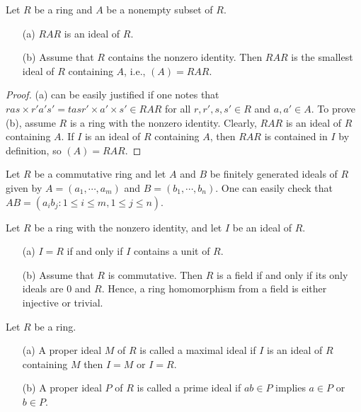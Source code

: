 \begin{prop}
    Let $R$ be a ring and $A$ be a nonempty subset of $R$.
    \begin{enumerate}
        \item[(a)]
        {
            $RAR$ is an ideal of $R$.
        }
        \item[(b)]
        {
            Assume that $R$ contains the nonzero identity.
            Then $RAR$ is the smallest ideal of $R$ containing $A$, i.e., $(A)=RAR$.
        }
    \end{enumerate}
\end{prop}
\begin{proof}
    (a) can be easily justified if one notes that $ras\times r'a's'=tasr'\times a'\times s'\in RAR$ for all $r, r', s, s'\in R$ and $a, a'\in A$.
    To prove (b), assume $R$ is a ring with the nonzero identity.
    Clearly, $RAR$ is an ideal of $R$ containing $A$.
    If $I$ is an ideal of $R$ containing $A$, then $RAR$ is contained in $I$ by definition, so $(A)=RAR$.
\end{proof}
\begin{obs}
    Let $R$ be a commutative ring and let $A$ and $B$ be finitely generated ideals of $R$ given by $A=(a_1, \cdots, a_m)$ and $B=(b_1, \cdots, b_n)$.
    One can easily check that $AB=(a_ib_j: 1\leq i\leq m, 1\leq j\leq n)$.
\end{obs}

\begin{prop}\label{field: trivial ideals only}
    Let $R$ be a ring with the nonzero identity, and let $I$ be an ideal of $R$.
    \begin{enumerate}
        \item[(a)]
        {
            $I=R$ if and only if $I$ contains a unit of $R$.
        }
        \item[(b)]
        {
            Assume that $R$ is commutative.
            Then $R$ is a field if and only if its only ideals are $0$ and $R$.
            Hence, a ring homomorphism from a field is either injective or trivial.
        }
    \end{enumerate}
\end{prop}

\begin{defi}
    Let $R$ be a ring.
    \begin{enumerate}
        \item[(a)]
        {
            A proper ideal $M$ of $R$ is called a maximal ideal if $I$ is an ideal of $R$ containing $M$ then $I=M$ or $I=R$.
        }
        \item[(b)]
        {
            A proper ideal $P$ of $R$ is called a prime ideal if $ab\in P$ implies $a\in P$ or $b\in P$.
        }
    \end{enumerate}
\end{defi}

